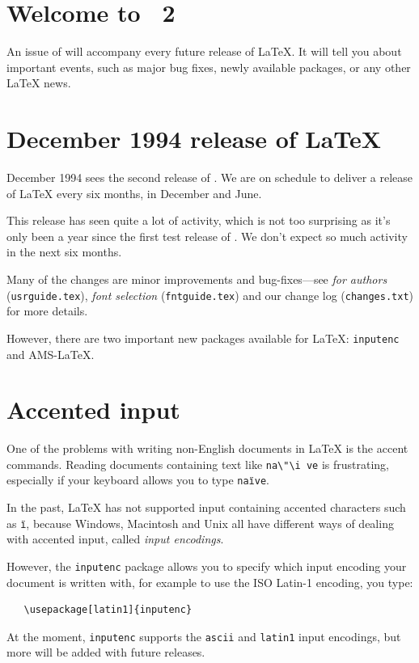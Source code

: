 \documentclass{ltnews}
\providecommand\pkg[1]{\texttt{#1}}
\begin{document}
\maketitle

\section{Welcome to \LaTeXNews~2}

An issue of \emph{\LaTeXNews} will accompany every future release of
\LaTeX.  It will tell you about important events, such as major bug
fixes, newly available packages, or any other \LaTeX{} news.

\section{December 1994 release of \LaTeX}

December 1994 sees the second release of \LaTeXe.  We are on schedule
to deliver a release of \LaTeX{} every six months, in December and
June.

This release has seen quite a lot of activity, which is not too
surprising as it's only been a year since the first test release of
\LaTeXe.  We don't expect so much activity in the next six months.

Many of the changes are minor improvements and bug-fixes---see
\emph{\LaTeXe{} for authors} (\verb|usrguide.tex|), \emph{\LaTeXe{}
font selection} (\verb|fntguide.tex|) and our change log
(\verb|changes.txt|) for more details.

However, there are two important new packages available for \LaTeX:
\pkg{inputenc} and AMS-\LaTeX.

\section{Accented input}

One of the problems with writing non-English documents in \LaTeX{} is
the accent commands.  Reading documents containing text like
\verb|na\"\i ve| is frustrating, especially if your keyboard allows
you to type \texttt{na\"\i ve}.

In the past, \LaTeX{} has not supported input containing accented
characters such as \texttt{\"\i}, because Windows, Macintosh and Unix
all have different ways of dealing with accented input, called
\emph{input encodings}.

However, the \verb|inputenc| package allows you to specify which input
encoding your document is written with, for example to use the ISO
Latin-1 encoding, you type:
\begin{verbatim}
   \usepackage[latin1]{inputenc}
\end{verbatim}
At the moment, \verb|inputenc| supports the \verb|ascii| and
\verb|latin1| input encodings, but more will be added with future
releases.
\end{document}

